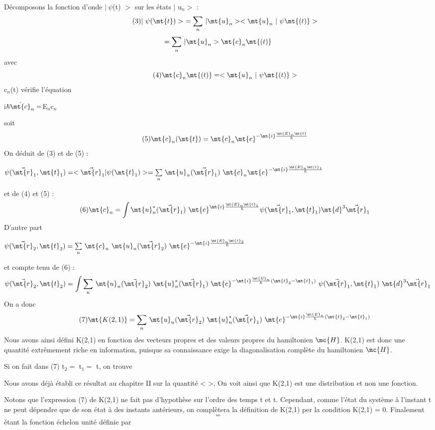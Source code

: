Décomposons la fonction d'onde $|\ \psi$(t) $>$ sur les états  $|$ u$_n>$ :
\[
\tag{3}|\ \psi(\mt{t})>\ = \underset{n}{\sum}\ | \mt{u}_n>< \mt{u}_n\ |\ \psi\mt{(t)}>
\]
\[
=\underset{n}{\sum}\ | \mt{u}_n>\mt{c}_n\mt{(t)}
\]
avec
\[
\tag{4}\mt{c}_n\mt{(t)}=< \mt{u}_n\ |\ \psi\mt{(t)}>
\]
c$_n$(t) vérifie l'équation
\begin{center}
i$\hbar\dot{\mt{c}}_n = $E$_n$c$_n$
\end{center}
soit
\[
\tag{5}\mt{c}_n(\mt{t})=\mt{c}_n\mt{ e}^{-\mt{i}\frac{\mt{E}_n\mt{t}}{\hbar}}
\]
On déduit de (3) et de (5) :
\begin{center}
$\psi(\vec{\mt{r}}_1,\mt{t}_1)=<\vec{\mt{r}}_1|\psi(\mt{t}_1)>=
\underset{n}{\sum}\ \mt{u}_n(\vec{\mt{r}}_1)\ \mt{c}_n\mt{ e}^{-\mt{i}\frac{\mt{E}_n\mt{t}_1}{\hbar}}$
\end{center}
et de (4) et (5) :
\[
\tag{6}\mt{c}_n=\int\mt{u}_n^*(\vec{\mt{r}}_1)\ \mt{ e}^{\mt{i}\frac{\mt{E}_n\mt{t}_1}{\hbar}}
\psi(\vec{\mt{r}}_1,\mt{t}_1)\mt{d}^3\vec{\mt{r}}_1
\]
D'autre part
\begin{center}
$\psi(\vec{\mt{r}}_2,\mt{t}_2)=
\underset{n}{\sum}\ \mt{c}_n\ \mt{u}_n(\vec{\mt{r}}_2)\ \mt{ e}^{-\mt{i}\frac{\mt{E}_n\mt{t}_2}{\hbar}}$
\end{center}
et compte tenu de (6) : 
\[
\psi(\vec{\mt{r}}_2,\mt{t}_2)=\int
\underset{n}{\sum}\ \mt{u}_n(\vec{\mt{r}}_2)\ \mt{u}_n^*(\vec{\mt{r}}_1)\ \mt{ e}^{-\mt{i}
\frac{\mt{E}_n}{\hbar}(\mt{t}_2-\mt{t}_1)}\ \psi(\vec{\mt{r}}_1,\mt{t}_1)\ \mt{d}^3\vec{\mt{r}}_1
\]
On a donc
\[
\tag{7}\mt{K(2,1)}=\underset{n}{\sum}\ \mt{u}_n(\vec{\mt{r}}_2)\ \mt{u}_n^*(\vec{\mt{r}}_1)\ \mt{ e}^{-\mt{i}
\frac{\mt{E}_n}{\hbar}(\mt{t}_2-\mt{t}_1)}
\]
Nous avons ainsi défini K(2,1) en fonction des vecteurs propres et
des valeurs propres du hamiltonien $\mc{H}$. K(2,1) est donc une quantité
extrêmement riche en information, puisque sa connaissance exige la diagonalisation complète du hamiltonien $\mc{H}$.

Si on fait dans (7) t$_2=$ t$_1=$ t, on trouve
\begin{center}
\end{center}
Nous avons déjà établi ce résultat au chapitre II sur la quantité
< >, On voit ainsi que K(2,1) est une distribution et non
une fonction.

Notons que l'expression (7) de K(2,1) ne fait pas d'hypothèse
sur l'ordre des temps t et t. Cependant, comme l'état du système à l'instant t ne peut dépendre que de son état à des instants antérieurs, on complètera la définition de K(2,1) per la condition K(2,1) = 0.
Finalement
\[
\tag{8}=
\]
étant la fonction échelon unité définie par
